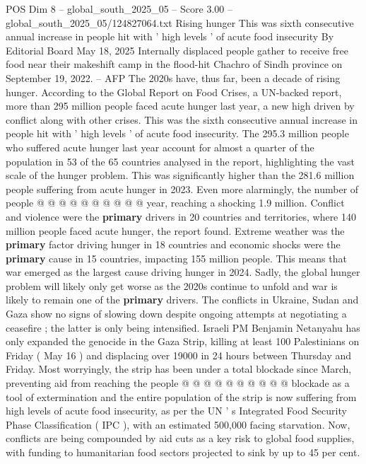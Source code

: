 \begin{textsample}{POS Dim 8 – global\_south\_2025\_05 – Score 3.00 – global\_south\_2025\_05/124827064.txt}  \label{ex:f8_pos_443}
Rising hunger This was sixth consecutive annual increase in people hit with ' high levels ' of acute food insecurity By Editorial Board May 18, 2025 Internally displaced people gather to receive free food near their makeshift camp in the flood-hit Chachro of Sindh province on September 19, 2022. -- AFP The 2020s have, thus far, been a decade of rising hunger.
According to the Global Report on Food Crises, a UN-backed report, more than 295 million people faced acute hunger last year, a new high driven by conflict along with other crises.
This was the sixth consecutive annual increase in people hit with ' high levels ' of acute food insecurity.
The 295.3 million people who suffered acute hunger last year account for almost a quarter of the population in 53 of the 65 countries analysed in the report, highlighting the vast scale of the hunger problem.
This was significantly higher than the 281.6 million people suffering from acute hunger in 2023.
Even more alarmingly, the number of people @ @ @ @ @ @ @ @ @ @ year, reaching a shocking 1.9 million.
Conflict and violence were the \textbf{primary} drivers in 20 countries and territories, where 140 million people faced acute hunger, the report found.
Extreme weather was the \textbf{primary} factor driving hunger in 18 countries and economic shocks were the \textbf{primary} cause in 15 countries, impacting 155 million people.
This means that war emerged as the largest cause driving hunger in 2024.
Sadly, the global hunger problem will likely only get worse as the 2020s continue to unfold and war is likely to remain one of the \textbf{primary} drivers.
The conflicts in Ukraine, Sudan and Gaza show no signs of slowing down despite ongoing attempts at negotiating a ceasefire ; the latter is only being intensified.
Israeli PM Benjamin Netanyahu has only expanded the genocide in the Gaza Strip, killing at least 100 Palestinians on Friday ( May 16 ) and displacing over 19000 in 24 hours between Thursday and Friday.
Most worryingly, the strip has been under a total blockade since March, preventing aid from reaching the people @ @ @ @ @ @ @ @ @ @ blockade as a tool of extermination and the entire population of the strip is now suffering from high levels of acute food insecurity, as per the UN ' s Integrated Food Security Phase Classification ( IPC ), with an estimated 500,000 facing starvation.
Now, conflicts are being compounded by aid cuts as a key risk to global food supplies, with funding to humanitarian food sectors projected to sink by up to 45 per cent.

\end{textsample}
